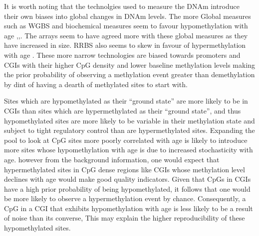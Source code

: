 \documentclass[
]{book}
\begin{document}
It is worth noting that the technolgies used to measure the DNAm introduce their own biases into global changes in DNAm levels. The more Global measures such as WGBS and biochemical measures seem to favour hypomethylation with age \citep{Wilson1987},\citep{Fraga2005},\citep{Heyn2012}. The arrays seem to have agreed more with these global measures as they have increased in size. RRBS also seems to skew in favour of hypermethylation with age \citep{Cole2017}. These more narrow technologies are biased towards promoters and CGIs with their higher CpG density and lower baseline methylation levels making the prior probability of observing a methylation event greater than demethylation by dint of having a dearth of methylated sites to start with.

Sites which are hypomethylated as their ``ground state'' are more likely to be in CGIs than sites which are hypermethylated as their ``ground state'', and thus hypomethylated sites are more likely to be variable in their methylation state and subject to tight regulatory control than are hypermethylated sites. Expanding the pool to look at CpG sites more poorly correlated with age is likely to introduce more sites whose hypomethylation with age is due to increased stochasticity with age. however from the background information, one would expect that hypermethylated sites in CpG dense regions like CGIs whose methylation level declines with age would make good quality indicators. Given that CpGs in CGIs have a high prior probability of being hypomethylated, it follows that one would be more likely to observe a hypermethylation event by chance. Consequently, a CpG in a CGI that exhibits hypomethylation with age is less likely to be a result of noise than its converse, This may explain the higher reproducibility of these hypomethylated sites.
\end{document}
